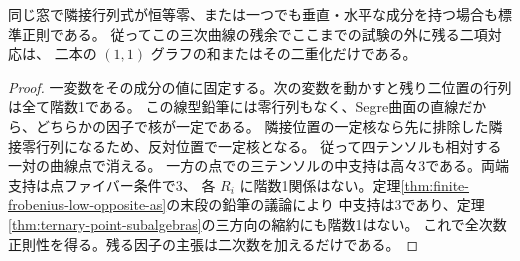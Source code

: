\begin{corollary}\label{cor:binary-vertical-ternary}
同じ窓で隣接行列式が恒等零、または一つでも垂直・水平な成分を持つ場合も標準正則である。
従ってこの三次曲線の残余でここまでの試験の外に残る二項対応は、
二本の $(1,1)$ グラフの和またはその二重化だけである。
\end{corollary}
\begin{proof}
一変数をその成分の値に固定する。次の変数を動かすと残り二位置の行列は全て階数1である。
この線型鉛筆には零行列もなく、Segre曲面の直線だから、どちらかの因子で核が一定である。
隣接位置の一定核なら先に排除した隣接零行列になるため、反対位置で一定核となる。
従って四テンソルも相対する一対の曲線点で消える。
一方の点での三テンソルの中支持は高々3である。両端支持は点ファイバー条件で3、
各 $R_i$ に階数1関係はない。定理\ref{thm:finite-frobenius-low-opposite-as}の末段の鉛筆の議論により
中支持は3であり、定理\ref{thm:ternary-point-subalgebras}の三方向の縮約にも階数1はない。
これで全次数正則性を得る。残る因子の主張は二次数を加えるだけである。
\end{proof}
